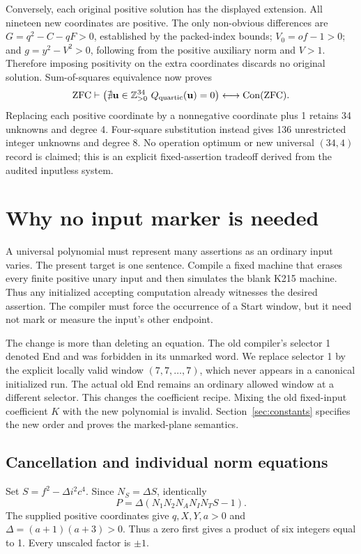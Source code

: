 \documentclass[11pt]{article}
\newcommand{\Pos}{\mathbb Z_{>0}}
\newcommand{\Con}{\operatorname{Con}}
\begin{document}
Conversely, each original positive solution has the displayed extension. All nineteen new coordinates are positive. The only non-obvious differences are \(G=q^2-C-qF>0\), established by the packed-index bounds; \(V_0=of-1>0\); and \(g=y^2-V^2>0\), following from the positive auxiliary norm and \(V>1\). Therefore imposing positivity on the extra coordinates discards no original solution. Sum-of-squares equivalence now proves
\[
 \mathrm{ZFC}\vdash
 \bigl(\nexists\mathbf u\in\Pos^{34}\ Q_{\rm quartic}(\mathbf u)=0\bigr)
 \longleftrightarrow\Con(\mathrm{ZFC}).
\]
Replacing each positive coordinate by a nonnegative coordinate plus 1 retains 34 unknowns and degree 4. Four-square substitution instead gives 136 unrestricted integer unknowns and degree 8. No operation optimum or new universal \((34,4)\) record is claimed; this is an explicit fixed-assertion tradeoff derived from the audited inputless system.

\section{Why no input marker is needed}\label{sec:proof}

A universal polynomial must represent many assertions as an ordinary input varies. The present target is one sentence. Compile a fixed machine that erases every finite positive unary input and then simulates the blank K215 machine. Thus any initialized accepting computation already witnesses the desired assertion. The compiler must force the occurrence of a Start window, but it need not mark or measure the input's other endpoint.

The change is more than deleting an equation. The old compiler's selector 1 denoted End and was forbidden in its unmarked word. We replace selector 1 by the explicit locally valid window \((7,7,\ldots,7)\), which never appears in a canonical initialized run. The actual old End remains an ordinary allowed window at a different selector. This changes the coefficient recipe. Mixing the old fixed-input coefficient \(K\) with the new polynomial is invalid. Section~\ref{sec:constants} specifies the new order and proves the marked-plane semantics.

\subsection{Cancellation and individual norm equations}
Set \(S=f^2-\Delta i^2c^4\). Since \(N_S=\Delta S\), identically
\begin{equation}\label{eq:cancel}
 P=\Delta\left(N_1N_2N_AN_IN_TS-1\right).
\end{equation}
The supplied positive coordinates give \(q,X,Y,a>0\) and
\(\Delta=(a+1)(a+3)>0\). Thus a zero first gives a product of six integers equal to 1. Every unscaled factor is \(\pm1\).
\end{document}
